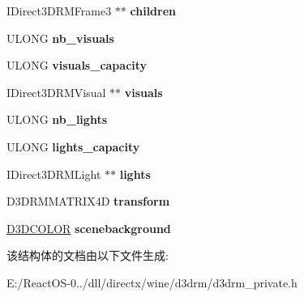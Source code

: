 \begin{DoxyCompactItemize}
I\+Direct3\+D\+R\+M\+Frame3 $\ast$$\ast$ {\bfseries children}
\item 
\mbox{\label{structd3drm__frame_acdc96a53ec823c3b25989933c8c1d23a}} 
U\+L\+O\+NG {\bfseries nb\+\_\+visuals}
\item 
\mbox{\label{structd3drm__frame_a8552efa9c847855fa74a7327718dd40e}} 
U\+L\+O\+NG {\bfseries visuals\+\_\+capacity}
\item 
\mbox{\label{structd3drm__frame_abe002b7219116c9ceb2174b0187d2b15}} 
I\+Direct3\+D\+R\+M\+Visual $\ast$$\ast$ {\bfseries visuals}
\item 
\mbox{\label{structd3drm__frame_ad074552fec6e67f57f8469b98b3df895}} 
U\+L\+O\+NG {\bfseries nb\+\_\+lights}
\item 
\mbox{\label{structd3drm__frame_afaebbd39fa93399f502c16aa3a30856b}} 
U\+L\+O\+NG {\bfseries lights\+\_\+capacity}
\item 
\mbox{\label{structd3drm__frame_a82a8cbc6466c9d102c0b7296b0d1427c}} 
I\+Direct3\+D\+R\+M\+Light $\ast$$\ast$ {\bfseries lights}
\item 
\mbox{\label{structd3drm__frame_ac3ffe674a84c32b0eab5631d4d58c497}} 
D3\+D\+R\+M\+M\+A\+T\+R\+I\+X4D {\bfseries transform}
\item 
\mbox{\label{structd3drm__frame_a5a143e9577b802ba0ab91874aadd5667}} 
\hyperlink{struct_d3_d_c_o_l_o_r}{D3\+D\+C\+O\+L\+OR} {\bfseries scenebackground}
\end{DoxyCompactItemize}


该结构体的文档由以下文件生成\+:\begin{DoxyCompactItemize}
\item 
E\+:/\+React\+O\+S-\/0../dll/directx/wine/d3drm/d3drm\+\_\+private.\+h\end{DoxyCompactItemize}
